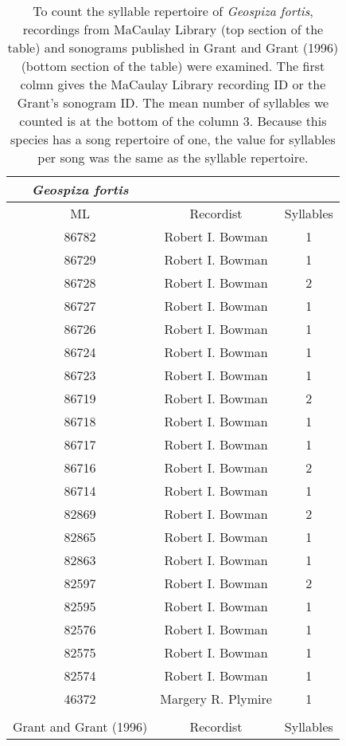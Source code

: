 \documentclass[a4paper,12pt]{article}
\begin{document}
\begin{longtable}{ccc}
\caption{To count the syllable repertoire of \textit{Geospiza fortis}, recordings from MaCaulay Library (top section of the table) and sonograms published in Grant and Grant (1996) (bottom section of the table) were examined. The first colmn gives the MaCaulay Library  recording ID or the Grant's sonogram ID. The mean number of syllables we counted is at the bottom of the column 3. Because this species has a song repertoire of one, the value for syllables per song was the same as the syllable repertoire.}\\
\hline
\textit{Geospiza fortis} & & \\
\hline
ML & Recordist & Syllables  \\
\hline
  86782 & Robert I. Bowman  & 1 \\ 
  86729 & Robert I. Bowman  & 1 \\ 
  86728 & Robert I. Bowman  & 2 \\ 
  86727 & Robert I. Bowman  & 1 \\ 
  86726 & Robert I. Bowman  & 1 \\ 
  86724 & Robert I. Bowman  & 1 \\ 
  86723 & Robert I. Bowman  & 1 \\ 
  86719 & Robert I. Bowman  & 2 \\ 
  86718 & Robert I. Bowman  & 1 \\ 
  86717 & Robert I. Bowman  & 1 \\ 
  86716 & Robert I. Bowman  & 2 \\ 
  86714 & Robert I. Bowman  & 1 \\ 
  82869 & Robert I. Bowman  & 2 \\ 
  82865 & Robert I. Bowman  & 1 \\ 
  82863 & Robert I. Bowman  & 1 \\ 
  82597 & Robert I. Bowman  & 2 \\ 
  82595 & Robert I. Bowman  & 1 \\ 
  82576 & Robert I. Bowman  & 1 \\ 
  82575 & Robert I. Bowman  & 1 \\ 
  82574 & Robert I. Bowman  & 1 \\ 
  46372 & Margery R. Plymire  & 1 \\
  \hline
  \\
  Grant and Grant (1996) &  Recordist & Syllables  \\

\end{longtable}
\end{document}

